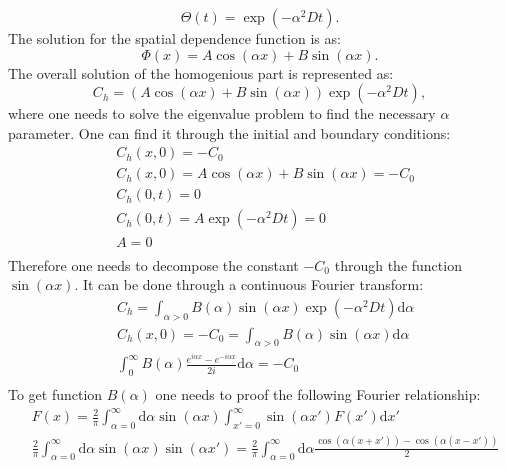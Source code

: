 \documentclass{article}
\begin{document}
\begin{description}
\begin{equation}
\Theta(t)=\exp(-\alpha^2 D t).
\end{equation}
The solution for the spatial dependence function is as:
\begin{equation}
\Phi(x)=A\cos(\alpha x)+ B\sin(\alpha x).
\end{equation}
The overall solution of the homogenious part is represented as:
\begin{equation}
C_h=(A\cos(\alpha x) + B\sin(\alpha x)) \exp(-\alpha^2 D t),
\end{equation}
where one needs to solve the eigenvalue problem to find the necessary $\alpha$ parameter. One can
find it through the initial and boundary conditions:
\begin{equation}
\begin{aligned}
&C_h(x,0)=-C_0\\
&C_h(x,0)=A\cos(\alpha x)+B\sin(\alpha x)=-C_0\\
&C_h(0,t)=0\\
&C_h(0,t)=A\exp(-\alpha^2 D t)=0\\
&A=0\\
\end{aligned}
\end{equation}
Therefore one needs to decompose the constant $-C_0$ through the function $\sin(\alpha x)$. It can
be done through a continuous Fourier transform:
\begin{equation}
\begin{aligned}
&C_h=\int_{\alpha>0}{B(\alpha) \sin(\alpha x) \exp(-\alpha^2 D t) \mathrm{d}\alpha}\\
&C_h(x,0)=-C_0=\int_{\alpha>0}{B(\alpha)\sin(\alpha x) \mathrm{d}\alpha}\\
&\int_{0}^{\infty}{B(\alpha) \frac{e^{i\alpha x}-e^{-i\alpha x}}{2 i}\mathrm{d} \alpha}=-C_0\\
\end{aligned}
\end{equation}
To get function $B(\alpha)$ one needs to proof the following Fourier relationship:
\begin{equation}
\begin{aligned}
&F(x)=\frac{2}{\pi}\int_{\alpha=0}^{\infty}{\mathrm{d}\alpha \sin(\alpha x)
\int_{x'=0}^{\infty}{\sin(\alpha x')F(x')\mathrm{d} x'}}\\
&\frac{2}{\pi}\int_{\alpha=0}^{\infty}{\mathrm{d}\alpha \sin(\alpha x)\sin(\alpha x')}=\frac{2}{\pi}
\int_{\alpha=0}^{\infty}{\mathrm{d}\alpha \frac{\cos(\alpha(x+x'))-\cos(\alpha(x-x'))}{2}}\\

\end{aligned}
\end{equation}
\end{description}
\end{document}
